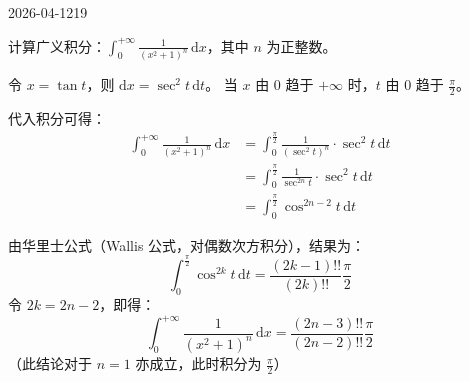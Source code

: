 \begin{mistake}{2026-04-12}{19}

\begin{problemcontent}
计算广义积分：\(\displaystyle \int_0^{+\infty} \frac{1}{(x^2+1)^n} \,\mathrm{d}x\)，其中 \(n\) 为正整数。
\end{problemcontent}

\begin{solutioncontent}
令 \(x = \tan t\)，则 \(\mathrm{d}x = \sec^2 t \,\mathrm{d}t\)。
当 \(x\) 由 \(0\) 趋于 \(+\infty\) 时，\(t\) 由 \(0\) 趋于 \(\frac{\pi}{2}\)。

代入积分可得：
\[
\begin{aligned}
\int_0^{+\infty} \frac{1}{(x^2+1)^n} \,\mathrm{d}x
&= \int_{0}^{\frac{\pi}{2}} \frac{1}{(\sec^2 t)^n} \cdot \sec^2 t \,\mathrm{d}t \\
&= \int_{0}^{\frac{\pi}{2}} \frac{1}{\sec^{2n} t} \cdot \sec^2 t \,\mathrm{d}t \\
&= \int_{0}^{\frac{\pi}{2}} \cos^{2n-2} t \,\mathrm{d}t
\end{aligned}
\]

由华里士公式（Wallis 公式，对偶数次方积分），结果为：
\[
\int_{0}^{\frac{\pi}{2}} \cos^{2k} t \,\mathrm{d}t = \frac{(2k-1)!!}{(2k)!!} \frac{\pi}{2}
\]
令 \(2k = 2n-2\)，即得：
\[
\int_{0}^{+\infty} \frac{1}{(x^2+1)^n} \,\mathrm{d}x = \frac{(2n-3)!!}{(2n-2)!!} \frac{\pi}{2}
\]
（此结论对于 \(n=1\) 亦成立，此时积分为 \(\frac{\pi}{2}\)）
\end{solutioncontent}


\end{mistake}
